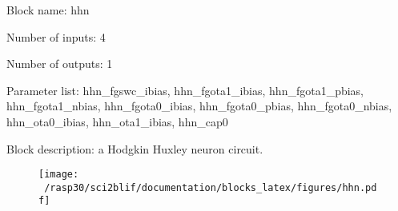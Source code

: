 \pagebreak

Block name: hhn

Number of inputs: 4

Number of outputs: 1

Parameter list: hhn\_fgswc\_ibias, hhn\_fgota1\_ibias, hhn\_fgota1\_pbias, hhn\_fgota1\_nbias, hhn\_fgota0\_ibias, hhn\_fgota0\_pbias, hhn\_fgota0\_nbias, hhn\_ota0\_ibias, hhn\_ota1\_ibias, hhn\_cap0

Block description: 
a Hodgkin Huxley neuron circuit. 

\begin{figure}[H]  %
\texttt{[image: ~/rasp30/sci2blif/documentation/blocks\_latex/figures/hhn.pdf]}
\end{figure}


